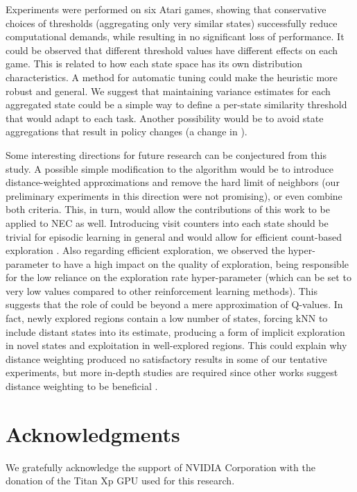 \documentclass{article}
\begin{document}
Experiments were performed on six Atari games, showing that conservative choices of thresholds (aggregating only very similar states) successfully reduce computational demands, while resulting in no significant loss of performance. It could be observed that different threshold values have different effects on each game. This is related to how each state space has its own distribution characteristics. A method for automatic tuning could make the heuristic more robust and general. We suggest that maintaining variance estimates for each aggregated state could be a simple way to define a per-state similarity threshold that would adapt to each task. Another possibility would be to avoid state aggregations that result in policy changes (a change in ). 

Some interesting directions for future research can be conjectured from this study. A possible simple modification to the algorithm would be to introduce distance-weighted approximations and remove the hard  limit of neighbors (our preliminary experiments in this direction were not promising), or even combine both criteria. This, in turn, would allow the contributions of this work to be applied to NEC as well. Introducing visit counters into each state should be trivial for episodic learning in general and would allow for efficient count-based exploration \cite{bellemare2016unifying}. Also regarding efficient exploration, we observed the  hyper-parameter to have a high impact on the quality of exploration, being responsible for the low reliance on the  exploration rate hyper-parameter (which can be set to very low values compared to other reinforcement learning methods). This suggests that the role of  could be beyond a mere approximation of Q-values. In fact, newly explored regions contain a low number of states, forcing kNN to include distant states into its estimate, producing a form of implicit exploration in novel states and exploitation in well-explored regions. This could explain why distance weighting produced no satisfactory results in some of our tentative experiments, but more in-depth studies are required since other works suggest distance weighting to be beneficial \cite{agostinelli2019memory}. 

\section*{Acknowledgments}

We gratefully acknowledge the support of NVIDIA Corporation with the donation of the Titan Xp GPU used for this research.

  
  
\end{document}
